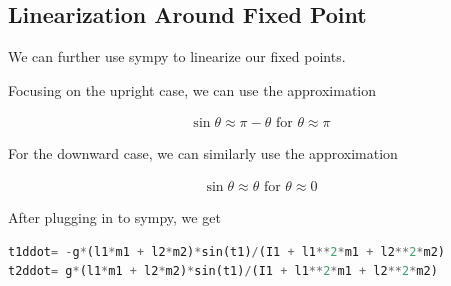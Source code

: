 \documentclass[conference]{IEEEtran}
\begin{document}





\subsection{Linearization Around Fixed Point}

We can further use sympy to linearize our fixed points.

Focusing on the upright case, we can use the approximation

\begin{align}
    \sin\theta \approx \pi - \theta \text{ for } \theta \approx \pi
\end{align}

For the downward case, we can similarly use the approximation

\begin{align}
    \sin\theta \approx \theta \text{ for } \theta \approx 0
\end{align}

After plugging in to sympy, we get 

\begin{lstlisting}[language=Python, frame=single]
t1ddot= -g*(l1*m1 + l2*m2)*sin(t1)/(I1 + l1**2*m1 + l2**2*m2)
t2ddot= g*(l1*m1 + l2*m2)*sin(t1)/(I1 + l1**2*m1 + l2**2*m2)
\end{lstlisting}
\end{document}
